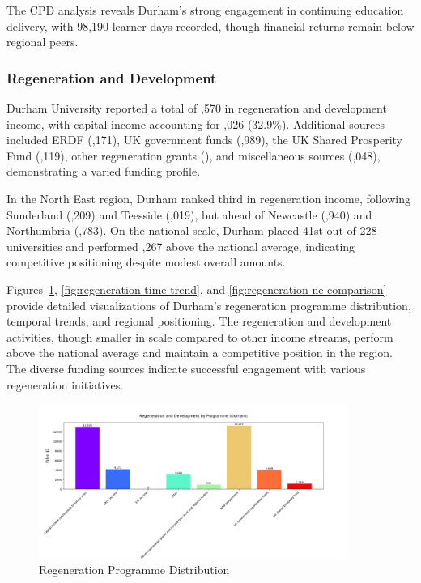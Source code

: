 \documentclass[journal,onecolumn, 10pt,draftclsnofoot]{IEEEtran}
\begin{document}
The CPD analysis reveals Durham's strong engagement in continuing education delivery, with 98,190 learner days recorded, though financial returns remain below regional peers.

\subsubsection{Regeneration and Development}

Durham University reported a total of ,570 in regeneration and development income, with capital income accounting for ,026 (32.9\%). Additional sources included ERDF (,171), UK government funds (,989), the UK Shared Prosperity Fund (,119), other regeneration grants (), and miscellaneous sources (,048), demonstrating a varied funding profile.

In the North East region, Durham ranked third in regeneration income, following Sunderland (,209) and Teesside (,019), but ahead of Newcastle (,940) and Northumbria (,783). On the national scale, Durham placed 41st out of 228 universities and performed ,267 above the national average, indicating competitive positioning despite modest overall amounts.

Figures~\ref{fig:regeneration-programme}, \ref{fig:regeneration-time-trend}, and \ref{fig:regeneration-ne-comparison} provide detailed visualizations of Durham's regeneration programme distribution, temporal trends, and regional positioning. The regeneration and development activities, though smaller in scale compared to other income streams, perform above the national average and maintain a competitive position in the region. The diverse funding sources indicate successful engagement with various regeneration initiatives.

\begin{figure}[h]
\centering
\includegraphics[width=0.9\textwidth]{Fig/figure14.regeneration_programme.png}
\caption{Regeneration Programme Distribution}
\label{fig:regeneration-programme}
\end{figure}
\end{document}
